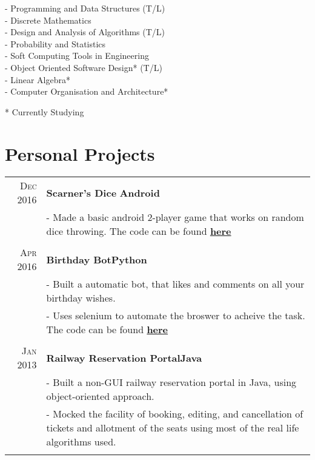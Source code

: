 \documentclass[a4paper,10pt]{extarticle} %
\begin{document}
 \begin{multicols}{2}
 - Programming and Data Structures (T/L) \\
 - Discrete Mathematics \\
 - Design and Analysis of Algorithms (T/L) \\
 - Probability and Statistics \\
 - Soft Computing Tools in Engineering \\
 - Object Oriented Software Design* (T/L) \\
 - Linear Algebra* \\
 - Computer Organisation and Architecture*
 \end{multicols}
 {\hfill{ * Currently Studying}}
 




\section{Personal Projects}

\begin{tabular}{r|p{18cm}}

\textsc{Dec 2016} & \textbf{Scarner's Dice} \textsc{}\hfill\textbf{Android}
\vspace{1mm} \\
& \footnotesize{- Made a basic android 2-player game that works on random dice throwing. The code can be found \textbf{\href{https://github.com/nitinkgp23/ScarnersDice}{here}}}\\
\multicolumn{2}{c}{} \\

\textsc{Apr 2016} & \textbf{Birthday Bot}\hfill\textbf{Python}
\vspace{1mm} \\
& \footnotesize{- Built a automatic bot, that likes and comments on all your birthday wishes.}\\
& \footnotesize{- Uses selenium to automate the broswer to acheive the task. The code can be found \textbf{\href{https://github.com/nitinkgp23/bdaybot}{here}}}\\
\multicolumn{2}{c}{} \\

\textsc{Jan 2013} & \textbf{Railway Reservation Portal}\hfill\textbf{Java}
\vspace{1mm} \\
& \footnotesize{- Built a non-GUI railway reservation portal in Java, using object-oriented approach.}\\
& \footnotesize{- Mocked the facility of booking, editing, and cancellation of tickets and allotment of the seats using most of the real life algorithms used.}\\
\multicolumn{2}{c}{} \\

\end{tabular}
\end{document}
